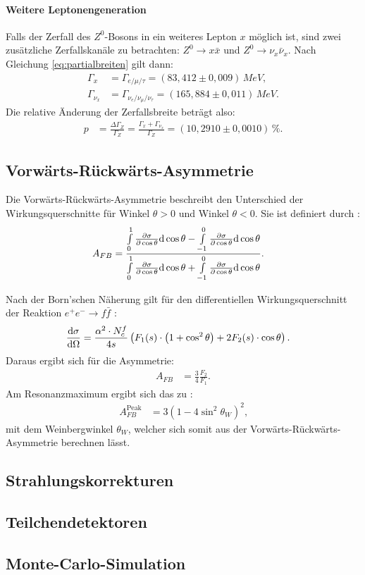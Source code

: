 \paragraph{Weitere Leptonengeneration} Falls der Zerfall des $Z^0$-Bosons in ein weiteres Lepton $x$ möglich ist, sind zwei zusätzliche Zerfallskanäle zu betrachten: $Z^0\rightarrow x\bar x$ und $Z^0\rightarrow \nu_x\bar{\nu}_x$. Nach Gleichung \ref{eq:partialbreiten} gilt dann:
\begin{align}
	\Gamma_x&=\Gamma_{e/\mu/\tau}=(83,412\pm0,009)\,\si{MeV}\text{,}\\
	\Gamma_{\nu_x}&=\Gamma_{\nu_e/\nu_\mu/\nu_\tau}=(165,884\pm0,011)\,\si{MeV}\text{.}
\end{align}
Die relative Änderung der Zerfallsbreite beträgt also:
\begin{align}
	p&=\frac{\Delta\Gamma_Z}{\Gamma_Z}=\frac{\Gamma_x+\Gamma_{\nu_x}}{\Gamma_Z}=(10,2910\pm0,0010)\,\%\text{.}
\end{align}

\subsection{Vorwärts-Rückwärts-Asymmetrie}
Die Vorwärts-Rückwärts-Asymmetrie beschreibt den Unterschied der Wirkungsquerschnitte für Winkel $\theta>0$ und Winkel $\theta<0$. Sie ist definiert durch \cite{anleitungalt}:
\begin{align}
	A_{FB}&=\frac{\int\limits_0^1\del[\sigma]{\cos\theta}\mathrm d\cos\theta
		-\int\limits_{-1}^0\del[\sigma]{\cos\theta}\mathrm d\cos\theta}
	{\int\limits_0^1\del[\sigma]{\cos\theta}\mathrm d\cos\theta
		+\int\limits_{-1}^0\del[\sigma]{\cos\theta}\mathrm d\cos\theta}\text{.}
\end{align}

Nach der Born'schen Näherung gilt für den differentiellen Wirkungsquerschnitt der Reaktion $e^+e^-\rightarrow f\bar f$ \cite{anleitungalt}:
\begin{align}
	\diff[\sigma]{\Omega}&=\frac{\alpha^2\cdot N_c^f}{4s}\left(F_1(s)\cdot\left(1+\cos^2\theta\right)+2F_2(s)\cdot\cos\theta\right)\text{.}
\end{align}
Daraus ergibt sich für die Asymmetrie:
\begin{align}
	A_{FB}&=\frac34\frac{F_2}{F_1}\text{.}
\end{align}
Am Resonanzmaximum ergibt sich das zu \cite{anleitungalt}:
\begin{align}
	A_{FB}^{\mathrm{Peak}}&=3\left(1-4\sin^2\theta_W\right)^2\text{,}
\end{align}
mit dem Weinbergwinkel $\theta_W$, welcher sich somit aus der Vorwärts-Rückwärts-Asymmetrie berechnen lässt.

\subsection{Strahlungskorrekturen}

\subsection{Teilchendetektoren}

\subsection{Monte-Carlo-Simulation}

